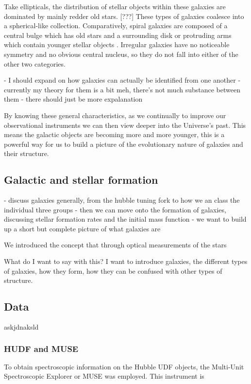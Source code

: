 \documentclass[12pt, twocolumn]{revtex4}    %
\begin{document}
Take ellipticals, the distribution of stellar objects within these galaxies are dominated by mainly redder old stars. [???] These types of galaxies coalesce into a spherical-like collection. Comparatively, spiral galaxies are composed of a central bulge which has old stars and a surrounding disk or protruding arms which contain younger stellar objects \cite{carroll_astro}. Irregular galaxies have no noticeable symmetry and no obvious central nucleus, so they do not fall into either of the other two categories.

- I should expand on how galaxies can actually be identified from one another
- currently my theory for them is a bit meh, there's not much substance between them
- there should just be more expalanation

By knowing these general characteristics, as we continually to improve our observational instruments we can then view deeper into the Universe's past. This means the galactic objects are becoming more and more younger, this is a powerful way for us to build a picture of the evolutionary nature of galaxies and their structure. 

\subsection{Galactic and stellar formation}

- discuss galaxies generally, from the hubble tuning fork to how we an class the individual three groups
- then we can move onto the formation of galaxies, discussing stellar formation rates and the initial mass function
- we want to build up a short but complete picture of what galaxies are 

We introduced the concept that through optical measurements of the stars 

What do I want to say with this? I want to introduce galaxies, the different types of galaxies, how they form, how they can be confused with other types of structure. 

\subsection{Data} 

askjdnaksld

\subsubsection{HUDF and MUSE}

To obtain spectroscopic information on the Hubble UDF objects, the Multi-Unit Spectroscopic Explorer or MUSE was employed. This instrument is 
\end{document}
